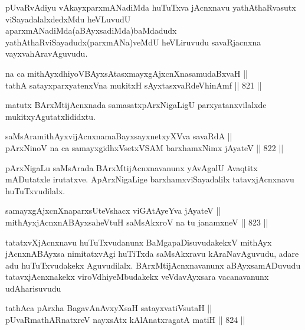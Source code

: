 \begin{artha}
pUvaRvAdiyu vAkayxparxmANadiMda huTuTxva jAcnxnavu yathAthaRvasutx viSayadalalxdedxMdu heVLuvudU aparxmANadiMda(aBAyxsadiMda)baMdadudx yathAthaRviSayadudx(parxmANa)veMdU heVLiruvudu savaRjacnxna vayxvahAravAguvudu.
\end{artha}


\begin{shl}
na ca mithAyxdhiyoV\s BAyxsAtasxmayxgAjxcnXnasamudaBxvaH || \\
tathA satayxparxyatenxVna mukitxH sAyxtasxvaRdeVhinAmf \hfill || 821 ||  
\end{shl}

\begin{artha}
matutx BArxMtijAcnxnada samasatxpArxNigaLigU parxyatanxvilalxde mukitxyAgutatxlididxtu.
\end{artha}

\begin{shl}
saMsAramithAyxvijAcnxnamaBayxsayxnetxyXVva savaRdA || \\
pArxNinoV na ca samayxgidhxVsetxVSAM barxhamxNimx jAyateV \hfill || 822 ||  
\end{shl}

\begin{artha}
pArxNigaLu saMsArada BArxMtijAcnxnavanunx yAvAgalU Avaqtitx mADutatxle irutatxve. ApArxNigaLige barxhamxviSayadalilx tatavxjAcnxnavu huTuTxvudilalx.
\end{artha}

\begin{shl}
samayxgAjxcnXnaparxsUteVshacx viGAtAyeYva jAyateV || \\
mithAyxjAcnxnABAyxsaheVtuH saMsAkxroV na tu janamxneV \hfill || 823 ||  
\end{shl}

\begin{artha}
tatatxvXjAcnxnavu huTuTxvudanunx BaMgapaDisuvudakekxV mithAyx jAcnxnABAyxsa nimitatxvAgi huTiTxda saMsAkxravu kAraNavAguvudu, adare adu huTuTxvudakekx Aguvudilalx. BArxMtijAcnxnavanunx aBAyxsamADuvudu tatavxjAcnxnakekx viroVdhiyeMbudakekx veVdavAyxsara vacanavanunx udAharisuvudu
\end{artha}

\begin{shl}
tathAca pArxha BagavAnAvxyXsaH satayxvatiVsutaH || \\
pUvaRmathARnatxreV nayxsAtx kAlAnatxragatA matiH \hfill || 824 ||  
\end{shl}

